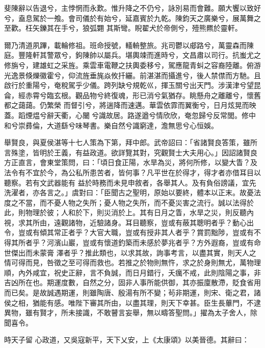 \begin{pinyinscope}
 斐陳辭以告退兮，主悖惘而永歎。惟升降之不仍兮，詠別易而會難。願大饗以致好兮，盍息駕於一飧。會司儀於有始兮，延嘉賓於九乾。陳鈞天之廣樂兮，展萬舞之至歡。枉矢鑠其在手兮，狼弧翾
 其斯彎。睨翟犬於帝側兮，殪熊羆於靈軒。



 爾乃清道夙蹕，載輪修祖。班命授號，轙輈整旅。兆司鬱以郕路兮，萬靈森而陳庭。豐隆軒其警眾兮，鉤陳帥以屬兵。堪輿竦而進時兮，文昌肅以司行。抗蚩尤之修旃兮，建雄虹之采旌。乘雲車電鞭之扶輿委移兮，駕應龍青虯之容裔陸離。俯游光逸景倏爍徽霍兮，仰流旌垂旄焱攸扦纚。前湛湛而攝進兮，後人禁僸而方馳。且啟行於重陽兮，奄稅駕乎少儀。跨列缺兮規乾巛，揮玉關兮出天門。涉漢津兮望昆侖，經赤霄兮臨玄根。觀品物兮終復魂，形已消兮氣猶存。眺懸舟之離離兮，懷舊都之藹藹。仍繁榮
 而督引兮，將遄降而速邁。華雲依霏而翼衡兮，日月炫晃而映蓋。蹈煙煴兮辭天衢，心闣兮識故居。路遂遒兮情欣欣，奄忽歸兮反常閭。修中和兮崇彞倫，大道繇兮味琴書。樂自然兮識窮達，澹無思兮心恒娛。



 舉賢良，與夏侯湛等十七人策為下第，拜中郎。武帝詔曰：「省諸賢良答策，雖所言殊塗，皆明於王義，有益政道。欲詳覽其對，究觀賢士大夫用心。」因詔諸賢良方正直言，會東堂策問，曰：「頃日食正陽，水旱為災，將何所修，以變大眚？及法令有不宜於今，為公私所患苦者，皆何事？凡平世在於得才，得才者亦借耳目以聽察。若有文武器能有
 益於時務而未見申敘者，各舉其人。及有負俗謗議，宜先洗濯者，亦各言之。」虞對曰：「臣聞古之聖明，原始以要終，體本以正末。故憂法度之不當，而不憂人物之失所；憂人物之失所，而不憂災害之流行。誠以法得於此，則物理於彼；人和於下，則災消於上。其有日月之眚，水旱之災，則反聽內視，求其所由，遠觀諸物，近驗諸身。耳目聽察，豈或有蔽其聰明者乎？動心出令，豈或有傾其常正者乎？大官大職，豈或有授非其人者乎？賞罰黜陟，豈或有不得其所者乎？河濱山巖，豈或有懷道釣築而未感於夢兆者乎？方外遐裔，豈或有命世傑出而未蒙膏
 澤者乎？推此類也，以求其故，詢事考言，以盡其實，則天人之情可得而見，咎徵之至可得而救也。若推之於物則無忤，求之於身則無尤，萬物理順，內外咸宜，祝史正辭，言不負誠，而日月錯行，夭癘不戒，此則陰陽之事，非吉凶所在也。期運度數，自然之分，固非人事所能供御，其亦振廩散滯，貶食省用而已矣。是故誠遇期運，則雖陶唐、殷湯有所不變；茍非期運，則宋、衛之君，諸侯之相，猶能有感。唯陛下審其所由，以盡其理，則天下幸甚。臣生長蓽門，不逮異物，雖有賢才，所未接識，不敢瞽言妄舉，無以疇答聖問。」擢為太子舍人，除聞喜令。



 時天子留
 心政道，又吳寇新平，天下乂安，上《太康頌》以美晉德。其辭曰：




\end{pinyinscope}
